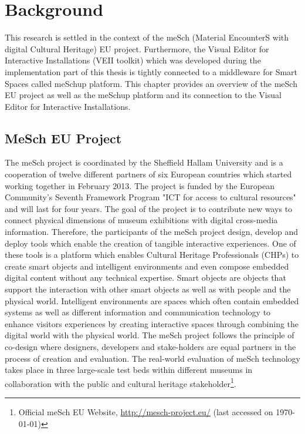 \chapter{Background}
\label{chap:background}

This research is settled in the context of the meSch (Material EncounterS with digital Cultural Heritage) EU project. Furthermore, the Visual Editor for Interactive Installations (VEII toolkit) which was developed during the implementation part of this thesis is tightly connected to a middleware for Smart Spaces called meSchup platform. This chapter provides an overview of the meSch EU project as well as the meSchup platform and its connection to the Visual Editor for Interactive Installations.

\section{MeSch EU Project}
\label{sec:meschproject}

The meSch project is coordinated by the Sheffield Hallam University and is a cooperation of twelve different partners of six European countries which started working together in February 2013. The project is funded by the European Community’s Seventh Framework Program "ICT for access to cultural resources" and will last for four years. The goal of the project is to contribute new ways to connect physical dimensions of museum exhibitions with digital cross-media information. Therefore, the participants of the meSch project design, develop and deploy tools which enable the creation of tangible interactive experiences. One of these tools is a platform which enables Cultural Heritage Professionals (CHPs) to create smart objects and intelligent environments and even compose embedded digital content without any technical expertise. Smart objects are objects that support the interaction with other smart objects as well as with people and the physical world. Intelligent environments are spaces which often contain embedded systems as well as different information and communication technology to enhance visitors experiences by creating interactive spaces through combining the digital world with the physical world. The meSch project follows the principle of co-design where designers, developers and stake-holders are equal partners in the process of creation and evaluation. The real-world evaluation of meSch technology takes place in three large-scale test beds within different museums in collaboration with the public and cultural heritage stakeholder\footnote{Official meSch EU Website, \url{http://mesch-project.eu/} (last accessed on \today)}. 

